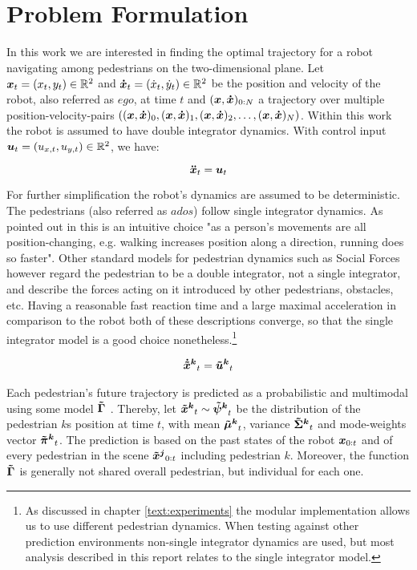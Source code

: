 \section{Problem Formulation}
\label{text:approach/formulation}
In this work we are interested in finding the optimal trajectory for a robot navigating among pedestrians on the two-dimensional plane. Let $\boldsymbol{x}_t = (x_t, y_t) \in \mathbb{R}^2$ and $\boldsymbol{\dot{x}}_t = (\dot{x}_t, \dot{y}_t) \in \mathbb{R}^2 $ be the position and velocity of the robot, also referred as $ego$, at time $t$ and $(\boldsymbol{x}, \boldsymbol{\dot{x}})_{0:N}$ a trajectory over multiple position-velocity-pairs $((\boldsymbol{x}, \boldsymbol{\dot{x}})_0, (\boldsymbol{x}, \boldsymbol{\dot{x}})_1, (\boldsymbol{x}, \boldsymbol{\dot{x}})_2, \hdots, (\boldsymbol{x}, \boldsymbol{\dot{x}})_N)$. Within this work the robot is assumed to have double integrator dynamics. With control input $\boldsymbol{u}_t = (u_{x, t}, u_{y, t}) \in \mathbb{R}^2$, we have: 

\begin{equation}
\boldsymbol{\ddot{x}}_t = \boldsymbol{u}_t
\label{eq:robot_dynamics}
\end{equation}

For further simplification the robot's dynamics are assumed to be deterministic. 
The pedestrians (also referred as $ados$) follow single integrator dynamics. As pointed out in \cite{Ivanovic18} this is an intuitive choice "as a person’s movements are all position-changing, e.g. walking increases position along a direction, running does so faster". Other standard models for pedestrian dynamics such as Social Forces \cite{Helbling1995} however regard the pedestrian to be a double integrator, not a single integrator, and describe the forces acting on it introduced by other pedestrians, obstacles, etc. Having a reasonable fast reaction time and a large maximal acceleration in comparison to the robot both of these descriptions converge, so that the single integrator model is a good choice nonetheless.\footnote{As discussed in chapter \ref{text:experiments} the modular implementation allows us to use different pedestrian dynamics. When testing against other prediction environments non-single integrator dynamics are used, but most analysis described in this report relates to the single integrator model.} 

\begin{align}
\dxped[k]_t = \uped[k]_t
\label{eq:pedestrian_dynamics}
\end{align}

Each pedestrian's future trajectory is predicted as a probabilistic and multimodal using some model $\distmodel[]$ . Thereby,  let $\xped[k]_t \sim \dist[k]_t$ be the distribution of the pedestrian $k$s position at time $t$, with mean $\muped[k]_t$, variance $\sigmaped[k]_t$ and mode-weights vector $\piped[k]_t$. The prediction is based on the past states of the robot $\boldsymbol{x}_{0:t}$ and of every pedestrian in the scene $\xped[j]_{0:t}$ including pedestrian $k$. Moreover, the function $\distmodel[]$ is generally not shared overall pedestrian, but individual for each one.

